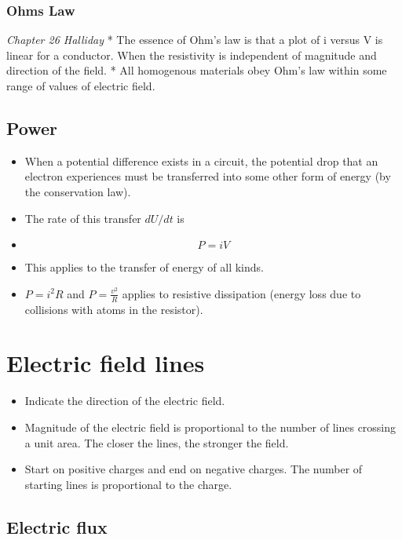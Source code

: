 \documentclass[11pt]{article}
\begin{document}
\hypertarget{ohms-law}{%
\subsubsection{Ohms Law}\label{ohms-law}}

\emph{Chapter 26 Halliday} * The essence of Ohm's law is that a plot of
i versus V is linear for a conductor. When the resistivity is
independent of magnitude and direction of the field. * All homogenous
materials obey Ohm's law within some range of values of electric field.

\hypertarget{power}{%
\subsection{Power}\label{power}}

\begin{itemize}
\tightlist
\item
  When a potential difference exists in a circuit, the potential drop
  that an electron experiences must be transferred into some other form
  of energy (by the conservation law).
\item
  The rate of this transfer \(dU/dt\) is
\item
  \[P = iV\]
\item
  This applies to the transfer of energy of all kinds.
\item
  \(P = i^2R\) and \(P = \frac{v^2}{R}\) applies to resistive
  dissipation (energy loss due to collisions with atoms in the
  resistor).
\end{itemize}

\hypertarget{electric-field-lines}{%
\section{Electric field lines}\label{electric-field-lines}}

\begin{itemize}
\tightlist
\item
  Indicate the direction of the electric field.
\item
  Magnitude of the electric field is proportional to the number of lines
  crossing a unit area. The closer the lines, the stronger the field.
\item
  Start on positive charges and end on negative charges. The number of
  starting lines is proportional to the charge.
\end{itemize}

\hypertarget{electric-flux}{%
\subsection{Electric flux}\label{electric-flux}}
\end{document}
